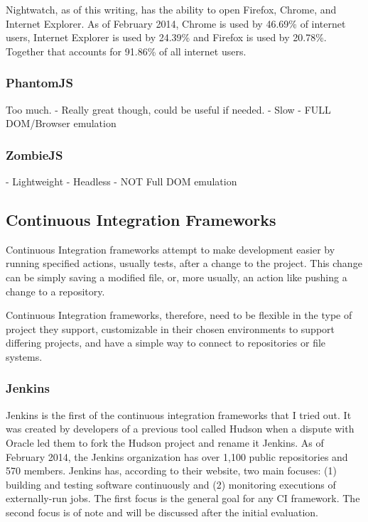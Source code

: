 \documentclass[11pt]{article}
\begin{document}
Nightwatch, as of this writing, has the ability to open Firefox, Chrome, and Internet Explorer. As of February 2014, Chrome is used by 46.69\% of internet users, Internet Explorer is used by 24.39\% and Firefox is used by 20.78\%.\cite{BrowserStats} Together that accounts for 91.86\% of all internet users.

\subsubsection{PhantomJS\cite{PhantomJS}}
Too much.
- Really great though, could be useful if needed.
- Slow
- FULL DOM/Browser emulation

\subsubsection{ZombieJS\cite{ZombieJS}}
- Lightweight
- Headless
- NOT Full DOM emulation

\subsection{Continuous Integration Frameworks}
Continuous Integration frameworks attempt to make development easier by running specified actions, usually tests, after a change to the project. This change can be simply saving a modified file, or, more usually, an action like pushing a change to a repository.

Continuous Integration frameworks, therefore, need to be flexible in the type of project they support, customizable in their chosen environments to support differing projects, and have a simple way to connect to repositories or file systems.

\subsubsection{Jenkins \cite{Jenkins}}
Jenkins is the first of the continuous integration frameworks that I tried out. It was created by developers of a previous tool called Hudson when a dispute with Oracle led them to fork the Hudson project and rename it Jenkins. As of February 2014, the Jenkins organization has over 1,100 public repositories and 570 members. \cite{JenkinsGitHub} Jenkins has, according to their website, two main focuses: (1) building and testing software continuously and (2) monitoring executions of externally-run jobs. The first focus is the general goal for any CI framework. The second focus is of note and will be discussed after the initial evaluation. 
\end{document}
